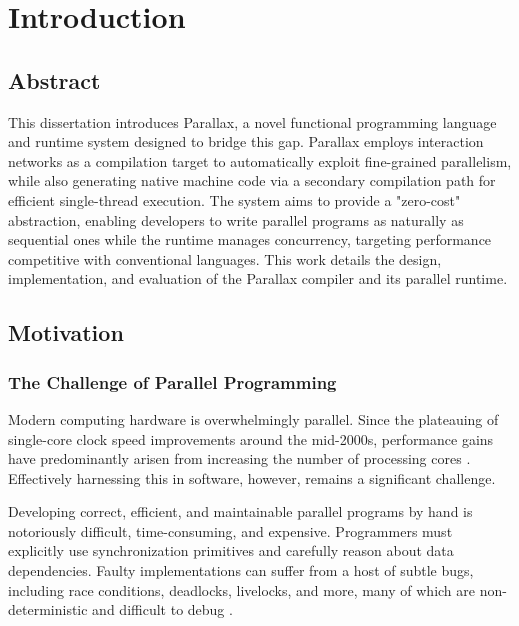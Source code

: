 \chapter{Introduction}

\section{Abstract}

This dissertation introduces Parallax, a novel functional programming language and runtime system designed to bridge this gap. Parallax employs interaction networks as a compilation target to automatically exploit fine-grained parallelism, while also generating native machine code via a secondary compilation path for efficient single-thread execution. The system aims to provide a "zero-cost" abstraction, enabling developers to write parallel programs as naturally as sequential ones while the runtime manages concurrency, targeting performance competitive with conventional languages. This work details the design, implementation, and evaluation of the Parallax compiler and its parallel runtime.

\section{Motivation}
\subsection{The Challenge of Parallel Programming}

Modern computing hardware is overwhelmingly parallel. Since the plateauing of single-core clock speed improvements around the mid-2000s, performance gains have predominantly arisen from increasing the number of processing cores \cite{Asanovic2006TheLandscape}. Effectively harnessing this in software, however, remains a significant challenge.

Developing correct, efficient, and maintainable parallel programs by hand is notoriously difficult, time-consuming, and expensive. Programmers must explicitly  use synchronization primitives and carefully reason about data dependencies. Faulty implementations can suffer from a host of subtle bugs, including race conditions, deadlocks, livelocks, and more, many of which are non-deterministic and difficult to debug \cite{Lee2006TheProblem}.

